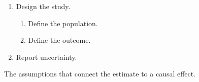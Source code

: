\documentclass{article}
\begin{document}
\begin{enumerate}[label=\arabic*.,leftmargin=*]
\item Design the study.
\begin{enumerate}[label=(\alph*),leftmargin=*]
\item Define the population.\item Define the outcome.
\end{enumerate}
\item Report uncertainty.
\end{enumerate}
\begin{description}[style=nextline]\item[Identification]The assumptions that connect the estimate to a causal effect.\end{description}
\end{document}
